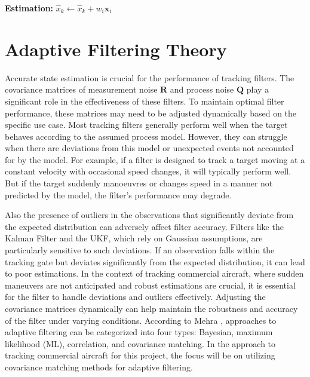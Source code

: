 \begin{algorithm}[H]
\begin{algorithmic}[1]
    \State \textbf{Estimation:}
    \vspace{1em}
        \vspace{0.5em}
        \State $\hat{x}_k \gets \hat{x}_k + w_i \mathbf{x}_i$
        \vspace{0.5em}
    \EndFor
    \vspace{1em}
\end{algorithmic}
\end{algorithm}

\section{Adaptive Filtering Theory}
Accurate state estimation is crucial for the performance of tracking filters. The covariance matrices of measurement noise $\mathbf{R}$ and process noise $\mathbf{Q}$ play a significant role in the effectiveness of these filters. To maintain optimal filter performance, these matrices may need to be adjusted dynamically based on the specific use case. Most tracking filters generally perform well when the target behaves according to the assumed process model. However, they can struggle when there are deviations from this model or unexpected events not accounted for by the model. For example, if a filter is designed to track a target moving at a constant velocity with occasional speed changes, it will typically perform well. But if the target suddenly manoeuvres or changes speed in a manner not predicted by the model, the filter's performance may degrade.

Also the presence of outliers in the observations that significantly deviate from the expected distribution can adversely affect filter accuracy. Filters like the Kalman Filter and the \ac{UKF}, which rely on Gaussian assumptions, are particularly sensitive to such deviations. If an observation falls within the tracking gate but deviates significantly from the expected distribution, it can lead to poor estimations. In the context of tracking commercial aircraft, where sudden maneuvers are not anticipated and robust estimations are crucial, it is essential for the filter to handle deviations and outliers effectively. Adjusting the covariance matrices dynamically can help maintain the robustness and accuracy of the filter under varying conditions.
\newline
\newline
According to Mehra \cite{Mehra1972}, approaches to adaptive filtering can be categorized into four types: Bayesian, maximum likelihood (ML), correlation, and covariance matching. In the approach to tracking commercial aircraft for this project, the focus will be on utilizing covariance matching methods for adaptive filtering.

